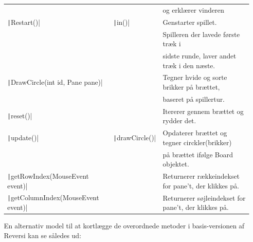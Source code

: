 \begin{table}[H]
\begin{tabular}{lll}
                                                                     &                                     & og erklærer vinderen                                 \\
        \texttt|Restart()|                                 & \texttt|in()|             & Genstarter spillet.                                  \\
                                                                     &                                     & Spilleren der lavede første træk i                   \\
                                                                     &                                     & sidste runde, laver andet træk i den næste.          \\
        \texttt|DrawCircle(int id, Pane pane)|             &                                     & Tegner hvide og sorte brikker på brættet,            \\
                                                                     &                                     & baseret på spillertur.                               \\
        \texttt|reset()|                                   &                                     & Itererer gennem brættet og rydder det.               \\
        \texttt|update()|                                  & \texttt|drawCircle()|     & Opdaterer brættet og tegner circkler(brikker)        \\
                                                                     &                                     & på brættet ifølge Board objektet.                    \\
        \texttt|getRowIndex(MouseEvent event)|             &                                     & Returnerer rækkeindekset for pane't, der klikkes på. \\
        \texttt|getColumnIndex(MouseEvent event)|          &                                     & Returnerer søjleindekset for pane't, der klikkes på. \\
        \bottomrule
    \end{tabular}
\end{table}
En alternativ model til at kortlægge de overordnede metoder i basis-versionen af Reversi kan se således ud:
